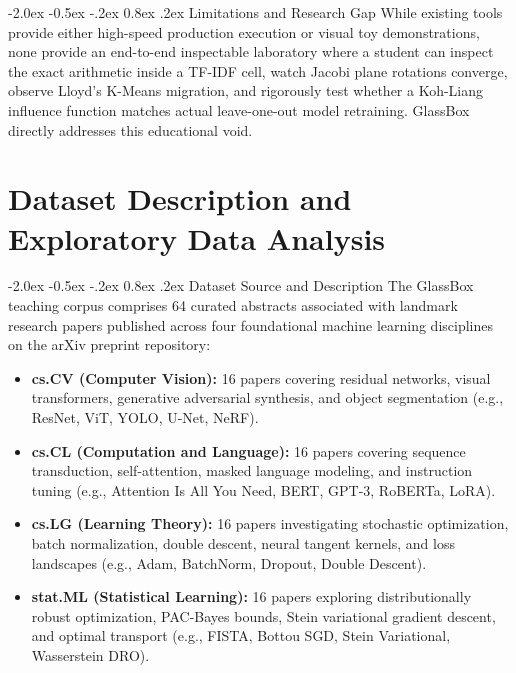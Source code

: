 \documentclass[12pt,a4paper]{report}
\makeatletter
\newenvironment{tightitemize}{%
  \begin{itemize}%
    \setlength{\itemsep}{1.5pt}%
    \setlength{\parskip}{0pt}%
    \setlength{\parsep}{0pt}%
}{%
  \end{itemize}%
}
\renewcommand\section{\@startsection {section}{1}{\z@}%
                                   {-2.0ex \@plus -0.5ex \@minus -.2ex}%
                                   {0.8ex \@plus.2ex}%
                                   {\normalfont\fontsize{14}{17}\bfseries\color{headerblue}}}
\makeatother
\begin{document}
\section{Limitations and Research Gap}
While existing tools provide either high-speed production execution or visual toy demonstrations, none provide an end-to-end inspectable laboratory where a student can inspect the exact arithmetic inside a TF-IDF cell, watch Jacobi plane rotations converge, observe Lloyd's K-Means migration, and rigorously test whether a Koh-Liang influence function matches actual leave-one-out model retraining. GlassBox directly addresses this educational void.

\chapter{Dataset Description and Exploratory Data Analysis}

\section{Dataset Source and Description}
The GlassBox teaching corpus comprises 64 curated abstracts associated with landmark research papers published across four foundational machine learning disciplines on the arXiv preprint repository:
\begin{tightitemize}
    \item \textbf{cs.CV (Computer Vision):} 16 papers covering residual networks, visual transformers, generative adversarial synthesis, and object segmentation (e.g., ResNet, ViT, YOLO, U-Net, NeRF).
    \item \textbf{cs.CL (Computation and Language):} 16 papers covering sequence transduction, self-attention, masked language modeling, and instruction tuning (e.g., Attention Is All You Need, BERT, GPT-3, RoBERTa, LoRA).
    \item \textbf{cs.LG (Learning Theory):} 16 papers investigating stochastic optimization, batch normalization, double descent, neural tangent kernels, and loss landscapes (e.g., Adam, BatchNorm, Dropout, Double Descent).
    \item \textbf{stat.ML (Statistical Learning):} 16 papers exploring distributionally robust optimization, PAC-Bayes bounds, Stein variational gradient descent, and optimal transport (e.g., FISTA, Bottou SGD, Stein Variational, Wasserstein DRO).
\end{tightitemize}
\end{document}
